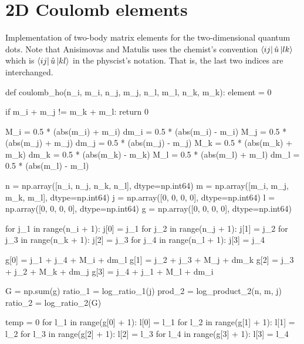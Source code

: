 \section{2D Coulomb elements}
\label{app:anisimovas}

Implementation of two-body matrix elements for the two-dimensional
quantum dots\cite{anisimovas1998energy}. Note that Anisimovas and Matulis uses the chemist's convention 
$\bra{ij} \hat{u} \ket{lk}$ which is 
$\bra{ij} \hat{u} \ket{kl}$ in the physcist's notation.
That is, the last two indices are interchanged.

\begin{python}
def coulomb_ho(n_i, m_i, n_j, m_j, n_l, m_l, n_k, m_k):
    element = 0

    if m_i + m_j != m_k + m_l:
        return 0

    M_i = 0.5 * (abs(m_i) + m_i)
    dm_i = 0.5 * (abs(m_i) - m_i)
    M_j = 0.5 * (abs(m_j) + m_j)
    dm_j = 0.5 * (abs(m_j) - m_j)
    M_k = 0.5 * (abs(m_k) + m_k)
    dm_k = 0.5 * (abs(m_k) - m_k)
    M_l = 0.5 * (abs(m_l) + m_l)
    dm_l = 0.5 * (abs(m_l) - m_l)

    n = np.array([n_i, n_j, n_k, n_l], dtype=np.int64)
    m = np.array([m_i, m_j, m_k, m_l], dtype=np.int64)
    j = np.array([0, 0, 0, 0], dtype=np.int64)
    l = np.array([0, 0, 0, 0], dtype=np.int64)
    g = np.array([0, 0, 0, 0], dtype=np.int64)

    for j_1 in range(n_i + 1):
        j[0] = j_1
        for j_2 in range(n_j + 1):
            j[1] = j_2
            for j_3 in range(n_k + 1):
                j[2] = j_3
                for j_4 in range(n_l + 1):
                    j[3] = j_4

                    g[0] = j_1 + j_4 + M_i + dm_l
                    g[1] = j_2 + j_3 + M_j + dm_k
                    g[2] = j_3 + j_2 + M_k + dm_j
                    g[3] = j_4 + j_1 + M_l + dm_i

                    G = np.sum(g)
                    ratio_1 = log_ratio_1(j)
                    prod_2 = log_product_2(n, m, j)
                    ratio_2 = log_ratio_2(G)

                    temp = 0
                    for l_1 in range(g[0] + 1):
                        l[0] = l_1
                        for l_2 in range(g[1] + 1):
                            l[1] = l_2
                            for l_3 in range(g[2] + 1):
                                l[2] = l_3
                                for l_4 in range(g[3] + 1):
                                    l[3] = l_4


\end{python}
